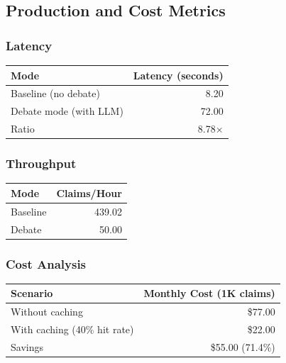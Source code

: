 \documentclass[12pt,a4paper,twoside]{article}
\begin{document}
\subsection{Production and Cost Metrics}

\subsubsection{Latency}

\begin{table}[H]
    \centering
    \begin{tabular}{|l|r|}
        \hline
        \textbf{Mode} & \textbf{Latency (seconds)} \\
        \hline
        Baseline (no debate) & 8.20 \\
        Debate mode (with LLM) & 72.00 \\
        Ratio & 8.78$\times$ \\
        \hline
    \end{tabular}
\end{table}

\subsubsection{Throughput}

\begin{table}[H]
    \centering
    \begin{tabular}{|l|r|}
        \hline
        \textbf{Mode} & \textbf{Claims/Hour} \\
        \hline
        Baseline & 439.02 \\
        Debate & 50.00 \\
        \hline
    \end{tabular}
\end{table}

\subsubsection{Cost Analysis}

\begin{table}[H]
    \centering
    \begin{tabular}{|l|r|}
        \hline
        \textbf{Scenario} & \textbf{Monthly Cost (1K claims)} \\
        \hline
        Without caching & \$77.00 \\
        With caching (40\% hit rate) & \$22.00 \\
        Savings & \$55.00 (71.4\%) \\
        \hline
    \end{tabular}
\end{table}
\end{document}
